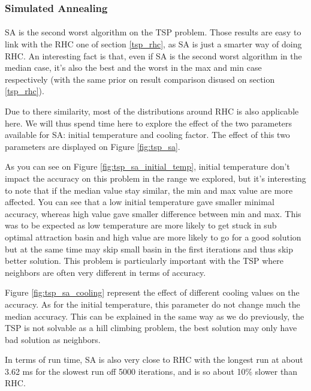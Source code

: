 \documentclass[twocolumn,a4paper,10pt]{article}
\begin{document}
\subsubsection{Simulated Annealing}

\label{tsp_sa} 

\paragraph{}

SA is the second worst algorithm on the TSP problem. Those results
are easy to link with the RHC one of section \ref{tsp_rhc}, as SA
is just a smarter way of doing RHC. An interesting fact is that, even
if SA is the second worst algorithm in the median case, it's also
the best and the worst in the max and min case respectively (with
the same prior on result comparison disused on section \ref{tsp_rhc}).

Due to there similarity, most of the distributions around RHC is also
applicable here. We will thus spend time here to explore the effect
of the two parameters available for SA: initial temperature and cooling
factor. The effect of this two parameters are displayed on Figure
\ref{fig:tsp_sa}.

As you can see on Figure \ref{fig:tsp_sa_initial_temp}, initial temperature
don't impact the accuracy on this problem in the range we explored,
but it's interesting to note that if the median value stay similar,
the min and max value are more affected. You can see that a low initial
temperature gave smaller minimal accuracy, whereas high value gave
smaller difference between min and max. This was to be expected as
low temperature are more likely to get stuck in sub optimal attraction
basin and high value are more likely to go for a good solution but
at the same time may skip small basin in the first iterations and
thus skip better solution. This problem is particularly important
with the TSP where neighbors are often very different in terms of
accuracy.

Figure \ref{fig:tsp_sa_cooling} represent the effect of different
cooling values on the accuracy. As for the initial temperature, this
parameter do not change much the median accuracy. This can be explained
in the same way as we do previously, the TSP is not solvable as a
hill climbing problem, the best solution may only have bad solution
as neighbors.

In terms of run time, SA is also very close to RHC with the longest
run at about 3.62 ms for the slowest run off 5000 iterations, and
is so about 10\% slower than RHC.
\end{document}
